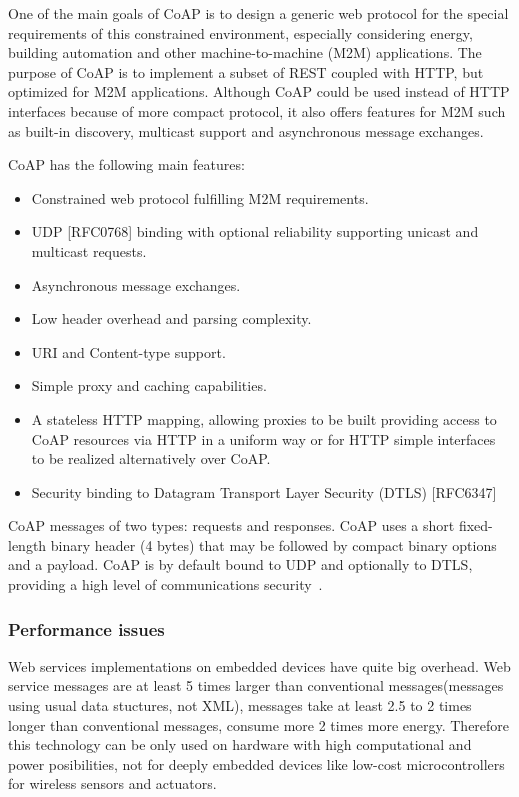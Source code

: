    One of the main goals of CoAP is to design a generic web protocol for
   the special requirements of this constrained environment, especially
   considering energy, building automation and other machine-to-machine
   (M2M) applications.  The purpose of CoAP is to implement a subset of REST
   coupled with HTTP, but optimized for M2M applications.  Although CoAP could
   be used instead of HTTP interfaces because of more compact protocol, it
   also offers features for M2M such as built-in discovery, multicast support and asynchronous message
   exchanges.
      
     CoAP has the following main features:
\begin{itemize}
  \item Constrained web protocol fulfilling M2M requirements.
  \item UDP [RFC0768] binding with optional reliability supporting unicast
      and multicast requests.
  \item Asynchronous message exchanges.
  \item Low header overhead and parsing complexity.
  \item URI and Content-type support.
  \item Simple proxy and caching capabilities.
  \item A stateless HTTP mapping, allowing proxies to be built providing
      access to CoAP resources via HTTP in a uniform way or for HTTP
      simple interfaces to be realized alternatively over CoAP.
  \item Security binding to Datagram Transport Layer Security (DTLS)
      [RFC6347]
\end{itemize}
   
CoAP messages  of two types: requests and responses. 
CoAP uses a short fixed-length binary header (4 bytes) that may be
followed by compact binary options and a payload.
CoAP is by default bound to UDP and optionally to DTLS, providing a high level
of communications security~\cite{wikipedia:coap}.

\subsubsection{Performance issues}

Web services implementations on embedded
devices have quite big overhead. Web service messages are at least 5 times
larger than conventional messages(messages using usual data stuctures, not XML),
messages take at least 2.5 to 2 times longer than conventional
messages, consume more 2 times more energy\cite{5470528}.
Therefore this technology can be only used on hardware with high computational and power
posibilities, not for deeply embedded devices like low-cost microcontrollers for wireless sensors and actuators. 

